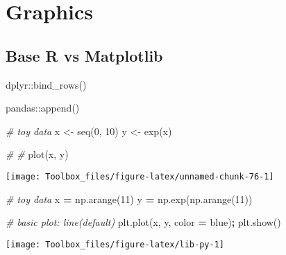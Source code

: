 \documentclass[
]{book}
\newenvironment{Shaded}{\begin{snugshade}}{\end{snugshade}}
\newcommand{\CommentTok}[1]{\textcolor[rgb]{0.56,0.35,0.01}{\textit{#1}}}
\newcommand{\DecValTok}[1]{\textcolor[rgb]{0.00,0.00,0.81}{#1}}
\newcommand{\FunctionTok}[1]{\textcolor[rgb]{0.00,0.00,0.00}{#1}}
\newcommand{\NormalTok}[1]{#1}
\newcommand{\OperatorTok}[1]{\textcolor[rgb]{0.81,0.36,0.00}{\textbf{#1}}}
\newcommand{\OtherTok}[1]{\textcolor[rgb]{0.56,0.35,0.01}{#1}}
\newcommand{\StringTok}[1]{\textcolor[rgb]{0.31,0.60,0.02}{#1}}
\begin{document}
\hypertarget{graphics}{%
\chapter{Graphics}\label{graphics}}

\hypertarget{base-r-vs-matplotlib}{%
\section{Base R vs Matplotlib}\label{base-r-vs-matplotlib}}

dplyr::bind\_rows()

pandas::append()

\begin{Shaded}
\begin{Highlighting}[]
\CommentTok{\# toy data}
\NormalTok{x }\OtherTok{\textless{}{-}} \FunctionTok{seq}\NormalTok{(}\DecValTok{0}\NormalTok{, }\DecValTok{10}\NormalTok{)}
\NormalTok{y }\OtherTok{\textless{}{-}} \FunctionTok{exp}\NormalTok{(x)}
\end{Highlighting}
\end{Shaded}

\begin{Shaded}
\begin{Highlighting}[]
\CommentTok{\#}
\CommentTok{\#}
\FunctionTok{plot}\NormalTok{(x, y)}
\end{Highlighting}
\end{Shaded}

\texttt{[image: Toolbox\_files/figure-latex/unnamed-chunk-76-1]}

\begin{Shaded}
\begin{Highlighting}[]
\CommentTok{\# toy data}
\NormalTok{x }\OperatorTok{=}\NormalTok{ np.arange(}\DecValTok{11}\NormalTok{)}
\NormalTok{y }\OperatorTok{=}\NormalTok{ np.exp(np.arange(}\DecValTok{11}\NormalTok{))}
\end{Highlighting}
\end{Shaded}

\begin{Shaded}
\begin{Highlighting}[]
\CommentTok{\# basic plot: line(default)}
\NormalTok{plt.plot(x, y, color }\OperatorTok{=} \StringTok{\textquotesingle{}blue\textquotesingle{}}\NormalTok{)}\OperatorTok{;}
\NormalTok{plt.show()}
\end{Highlighting}
\end{Shaded}

\texttt{[image: Toolbox\_files/figure-latex/lib-py-1]}
\end{document}
